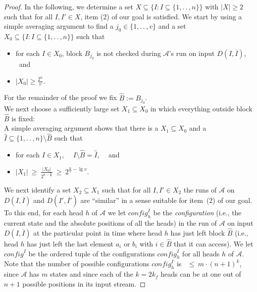 \documentclass[proceedings]{stacs}
\theoremstyle{plain}\newtheorem{satz}[thm]{Satz}
\theoremstyle{definition}\newtheorem{crucial}[thm]{Crucial Definition}
\newcommand{\ov}[1]{\overline{#1}}
\renewcommand*{\geq}{\ensuremath{\geqslant}}
\renewcommand*{\leq}{\ensuremath{\leqslant}}
\newcommand{\twodots}{.\,.\,}
\newcommand{\set}[1]{\ensuremath{\{ #1 \}}}
\newcommand{\setc}[2]{\set{ #1 : #2}}
\newcommand*{\A}{\ensuremath{\mathcal{A}}}
\newenvironment{mi}{\begin{itemize}}{\end{itemize}}
\newcommand{\kf}{\ensuremath{k_{\scriptscriptstyle f}}}
\newcommand{\vv}{\ensuremath{v}}
\newcommand{\config}{\ensuremath{\textit{config}}}
\begin{document}
\begin{proof}
In the following, we determine a set 
$X\subseteq \setc{I}{I\subseteq\set{1,\twodots,n}}$ with $|X|\geq 2$ 
such that for all $I,I'\in X$, item (2) of our goal is satisfied.
We start by using a simple averaging argument to find a
$j_0\in\set{1,\twodots,\vv}$ and 
a set $X_0\subseteq \setc{I}{I\subseteq\set{1,\twodots,n}}$
such that \vspace{1ex}
\begin{mi}
 \item 
   for each $I\in X_0$, block $B_{j_0}$ is not checked during $\A$'s run on input
   $D(I,\ov{I})$, \ and  \vspace{1ex}
 \item 
   $|X_0| \geq \frac{2^n}{\vv}$. \vspace{1ex}
\end{mi}
For the remainder of the proof we fix $\hat{B}:= B_{j_0}$.
\\
We next choose a sufficiently large set $X_1\subseteq X_0$ in which everything outside
block $\hat{B}$ is fixed:\\
A simple averaging argument shows that there is a
$X_1\subseteq X_0$ and a $\hat{I}\subseteq \set{1,\twodots,n}\setminus \hat{B}$ such that
\vspace{1ex}
\begin{mi}
 \item
   for each $I\in X_1$, \ \ $I\setminus \hat{B} = \hat{I}$, \ \ and \vspace{1ex}
 \item 
   $|X_1| \ \geq \ \frac{|X_0|}{2^{n-\frac{n}{\vv}}} \ \geq \ 2^{\frac{n}{\vv}-\lg \vv}$.
   \vspace{1ex}
\end{mi}
We next identify a set $X_2\subseteq X_1$ such that for all $I,I'\in X_2$ the runs of
$\A$ on $D(I,\ov{I})$ and $D(I',\ov{I'})$ are ``similar'' in a sense suitable for
item~(2) of our goal. To this end, for each head $h$ of $\A$ we let
$\config_h^I$ be the \emph{configuration} (i.e., the current state and the absolute
positions of all the heads) in the run of $\A$ on input $D(I,\ov{I})$ at the 
particular point in time where head $h$ has just left block $\hat{B}$ (i.e., head
$h$ has just left the last element $a_i$ or $b_i$ with $i\in \hat{B}$ that it can
access).
We let $\config^I$ be the ordered tuple of the configurations $\config_h^I$ for all
heads $h$ of $\A$.
Note that the number of possible configurations $\config_h^I$ is 
\ $\leq \ m\cdot (n{+}1)^{k}$, since $\A$ has $m$ states and since each of the
$k = 2\kf$ heads can be at one out of $n{+}1$ possible positions in its input stream.

\end{proof}
\end{document}
